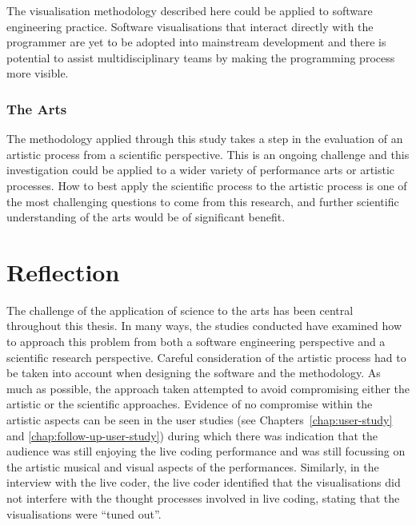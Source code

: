 The visualisation methodology described here could be applied to software engineering practice. Software visualisations that interact directly with the programmer are yet to be adopted into mainstream development and there is potential to assist multidisciplinary teams by making the programming process more visible.

\subsubsection{The Arts}

The methodology applied through this study takes a step in the evaluation of an artistic process from a scientific perspective. This is an ongoing challenge and this investigation could be applied to a wider variety of performance arts or artistic processes. How to best apply the scientific process to the artistic process is one of the most challenging questions to come from this research, and further scientific understanding of the arts would be of significant benefit.

\section{Reflection}

The challenge of the application of science to the arts has been central throughout this thesis. In many ways, the studies conducted have examined how to approach this problem from both a software engineering perspective and a scientific research perspective. Careful consideration of the artistic process had to be taken into account when designing the software and the methodology. As much as possible, the approach taken attempted to avoid compromising either the artistic or the scientific approaches. Evidence of no compromise within the artistic aspects can be seen in the user studies (see Chapters~\ref{chap:user-study} and \ref{chap:follow-up-user-study}) during which there  was indication that the audience was still enjoying the live coding performance and was still focussing on the artistic musical and visual aspects of the performances. Similarly, in the interview with the live coder, the live coder identified that the visualisations did not interfere with the thought processes involved in live coding, stating that the visualisations were ``tuned out''.



